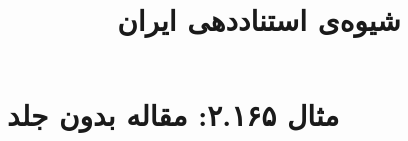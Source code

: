 \documentclass[a4paper,10pt]{article}
\begin{document}
\title{شیوه‌ی استناددهی ایران
 }
\author{}
\date{}
\maketitle



\section*{مثال ۲.۱۶۵: مقاله بدون جلد}

\cite{عجمی1383}\\
\cite{meyerovitch1959}\\






\end{document}
